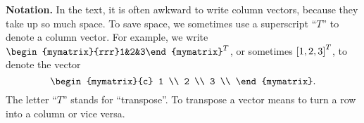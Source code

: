 \noindent\textbf{Notation.}
In the text, it is often awkward to write column vectors, because they
take up so much space. To save space, we sometimes use a superscript
``$T$'' to denote a column vector. For example, we write
$\begin{mymatrix}{rrr}1&2&3\end{mymatrix}^T$, or sometimes
$\left[1, 2, 3\right]^T$, to denote the vector
\begin{equation*}
  \begin{mymatrix}{c}
    1 \\
    2 \\
    3 \\
  \end{mymatrix}.
\end{equation*}
The letter ``$T$'' stands for ``transpose''. To transpose a vector
means to turn a row into a column or vice versa.


